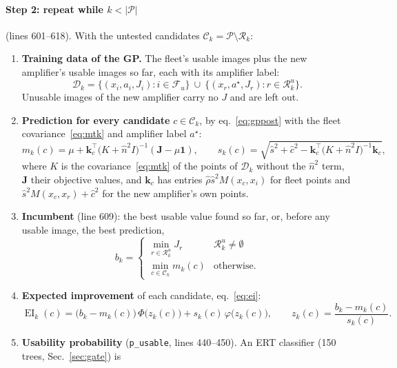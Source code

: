 \documentclass[10pt,a4paper]{article}
\newcommand{\code}[1]{\texttt{\small #1}}
\newcommand{\EI}{\operatorname{EI}}
\newcommand{\one}{\mathbf 1}
\begin{document}
\paragraph{Step 2: repeat while $k<|\mathcal P|$} (lines 601--618). With the untested candidates
$\mathcal C_k=\mathcal P\setminus\mathcal R_k$:
\begin{enumerate}[label=(\alph*),leftmargin=2em]
\item \textbf{Training data of the GP.} The fleet's usable images plus the new amplifier's usable images so far, each with its
  amplifier label:
  \begin{equation}
  \mathcal D_k=\{(x_i,a_i,J_i):i\in\mathcal F_u\}\ \cup\ \{(x_r,a^\star,J_r):r\in\mathcal R^u_k\}.
  \end{equation}
  Unusable images of the new amplifier carry no $J$ and are left out.
\item \textbf{Prediction for every candidate} $c\in\mathcal C_k$, by eq.~\eqref{eq:gppost} with the fleet covariance~\eqref{eq:mtk}
  and amplifier label $a^\star$:
  \begin{equation}
  m_k(c)=\mu+\mathbf k_c^\top\big(K+\hat n^2I\big)^{-1}(\mathbf J-\mu\one),\qquad
  s_k(c)=\sqrt{\hat s^2+\hat c^2-\mathbf k_c^\top\big(K+\hat n^2I\big)^{-1}\mathbf k_c},
  \end{equation}
  where $K$ is the covariance~\eqref{eq:mtk} of the points of $\mathcal D_k$ without the $\hat n^2$ term, $\mathbf J$ their
  objective values, and $\mathbf k_c$ has entries $\hat\rho\hat s^2M(x_c,x_i)$ for fleet points and $\hat s^2M(x_c,x_r)+\hat c^2$ for the
  new amplifier's own points.
\item \textbf{Incumbent} (line 609): the best usable value found so far, or, before any usable image, the best prediction,
  \begin{equation}
  b_k=\begin{cases}\min_{r\in\mathcal R_k^u}J_r & \mathcal R_k^u\neq\emptyset\\[2pt] \min_{c\in\mathcal C_k}m_k(c) & \text{otherwise.}\end{cases}
  \end{equation}
\item \textbf{Expected improvement} of each candidate, eq.~\eqref{eq:ei}:
  \begin{equation}
  \EI_k(c)=\big(b_k-m_k(c)\big)\,\Phi\big(z_k(c)\big)+s_k(c)\,\varphi\big(z_k(c)\big),\qquad z_k(c)=\frac{b_k-m_k(c)}{s_k(c)} .
  \end{equation}
\item \textbf{Usability probability} (\code{p\_usable}, lines 440--450). An ERT classifier (150 trees, Sec.~\ref{sec:gate}) is

\end{enumerate}
\end{document}
